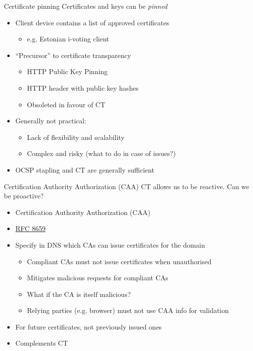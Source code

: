 \begin{frame}{Certificate pinning}
  Certificates and keys can be \emph{pinned}
  \begin{itemize}[<+(1)->]
    \item Client device contains a list of approved certificates
    \begin{itemize}
      \item e.g. Estonian i-voting client
    \end{itemize}
    \item \enquote{Precursor} to certificate transparency
    \begin{itemize}
      \item HTTP Public Key Pinning
      \item HTTP header with public key hashes
      \item Obsoleted in favour of CT
    \end{itemize}
    \item Generally not practical:
    \begin{itemize}
      \item Lack of flexibility and scalability
      \item Complex and risky (what to do in case of issues?)
    \end{itemize}
    \item OCSP stapling and CT are generally sufficient
  \end{itemize}
\end{frame}

\begin{frame}{Certification Authority Authorization (CAA)}
  CT allows us to be reactive.
  Can we be proactive?
  \begin{itemize}[<+(1)->]
    \item Certification Authority Authorization (CAA)
    \item \href{https://datatracker.ietf.org/doc/html/rfc8659}{RFC 8659}
    \item Specify in DNS which CAs can issue certificates for the domain
    \begin{itemize}
      \item Compliant CAs must not issue certificates when unauthorised
      \item Mitigates malicious requests for compliant CAs
      \item What if the CA is itself malicious?
      \item Relying parties (e.g. browser) must not use CAA info for validation
    \end{itemize}
    \item For future certificates, not previously issued ones
    \item Complements CT
  \end{itemize}
\end{frame}


